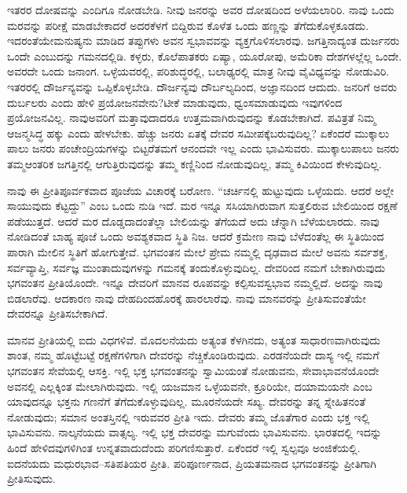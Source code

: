 ಇತರರ ದೋಷವನ್ನು ಎಂದಿಗೂ ನೋಡಬೇಡಿ. ನೀವು ಜನರನ್ನು ಅವರ ದೋಷದಿಂದ ಅಳೆಯಲಾರಿರಿ. ನಾವು ಒಂದು ಮರವನ್ನು ಪರೀಕ್ಷೆ ಮಾಡಬೇಕಾದರೆ ಅದರ\break ಕೆಳಗೆ ಬಿದ್ದಿರುವ ಕೊಳೆತ ಒಂದು ಹಣ್ಣನ್ನು ತೆಗೆದುಕೊಳ್ಳಕೂಡದು. ಇದರಂತೆಯೇ\break ಮನುಷ್ಯನು ಮಾಡಿದ ತಪ್ಪುಗಳು ಅವನ ಸ್ವಭಾವವನ್ನು ವ್ಯಕ್ತಗೊಳಿಸಲಾರವು. ಜಗತ್ತಿನಾದ್ಯಂತ ದುರ್ಜನರು ಒಂದೇ ಎಂಬುದನ್ನು ಗಮನದಲ್ಲಿಡಿ. ಕಳ್ಳರು, ಕೊಲೆಪಾತಕರು ಏಷ್ಯಾ, ಯೂರೋಪು, ಅಮೆರಿಕಾ ದೇಶಗಳಲ್ಲೆಲ್ಲ ಒಂದೇ. ಅವರದೇ ಒಂದು ಜನಾಂಗ. ಒಳ್ಳೆಯವರಲ್ಲಿ, ಪರಿಶುದ್ಧರಲ್ಲಿ, ಬಲಾಢ್ಯರಲ್ಲಿ ಮಾತ್ರ ನೀವು ವೈವಿಧ್ಯವನ್ನು ನೋಡುವಿರಿ. ಇತರರಲ್ಲಿ ದೌರ್ಜನ್ಯವನ್ನು ಒಪ್ಪಿಕೊಳ್ಳಬೇಡಿ. ದೌರ್ಜನ್ಯವು ದೌರ್ಬಲ್ಯದಿಂದ, ಅಜ್ಞಾನದಿಂದ ಆದುದು. ಜನರಿಗೆ ಅವರು ದುರ್ಬಲರು ಎಂದು ಹೇಳಿ ಪ್ರಯೋಜನವೇನು?\break ಟೀಕೆ ಮಾಡುವುದು, ಧ್ವಂಸಮಾಡುವುದು ಇವುಗಳಿಂದ ಪ್ರಯೋಜನವಿಲ್ಲ. ನಾವು\break ಅವರಿಗೆ ಮತ್ತಾವುದಾದರೂ ಉತ್ತಮವಾಗಿರುವುದನ್ನು ಕೊಡಬೇಕಾಗಿದೆ. ಪವಿತ್ರತೆ ನಿಮ್ಮ ಆಜನ್ಮಸಿದ್ಧ ಹಕ್ಕು ಎಂದು ಹೇಳಬೇಕು. ಹೆಚ್ಚು ಜನರು ಏತಕ್ಕೆ ದೇವರ ಸಮೀಪಕ್ಕೆ\break ಬರುವುದಿಲ್ಲ? ಏಕೆಂದರೆ ಮುಕ್ಕಾಲು ಪಾಲು ಜನರು ಪಂಚೇಂದ್ರಿಯಗಳನ್ನು ಬಿಟ್ಟರೆ\break ತಮಗೆ ಆನಂದವೇ ಇಲ್ಲ ಎಂದು ಭಾವಿಸುವರು. ಮುಕ್ಕಾಲುಪಾಲು ಜನರು ತಮ್ಮ\break ಆಂತರಿಕ ಜಗತ್ತಿನಲ್ಲಿ ಆಗುತ್ತಿರುವುದನ್ನು ತಮ್ಮ ಕಣ್ಣಿನಿಂದ ನೋಡುವುದಿಲ್ಲ, ತಮ್ಮ ಕಿವಿಯಿಂದ ಕೇಳುವುದಿಲ್ಲ.

ನಾವು ಈ ಪ್ರೀತಿಪೂರ್ವಕವಾದ ಪೂಜೆಯ ವಿಚಾರಕ್ಕೆ ಬರೋಣ. “ಚರ್ಚಿನಲ್ಲಿ ಹುಟ್ಟುವುದು ಒಳ್ಳೆಯದು. ಆದರೆ ಅಲ್ಲೇ ಸಾಯುವುದು ಕೆಟ್ಟದ್ದು” ಎಂಬ ಒಂದು ನುಡಿ ಇದೆ. ಮರ ಇನ್ನೂ ಸಸಿಯಾಗಿರುವಾಗ ಸುತ್ತಲಿರುವ ಬೇಲಿಯಿಂದ ರಕ್ಷಣೆ ಪಡೆಯುತ್ತದೆ. ಆದರೆ ಮರ ದೊಡ್ಡದಾದಂತೆಲ್ಲಾ ಬೇಲಿಯನ್ನು ತೆಗೆಯದೆ ಅದು ಚೆನ್ನಾಗಿ ಬೆಳೆಯಲಾರದು. ನಾವು ನೋಡಿದಂತೆ ಬಾಹ್ಯ ಪೂಜೆ ಒಂದು ಅವಶ್ಯಕವಾದ ಸ್ಥಿತಿ ನಿಜ. ಆದರೆ ಕ್ರಮೇಣ ನಾವು ಬೆಳೆದಂತೆಲ್ಲ ಈ ಸ್ಥಿತಿಯಿಂದ ಪಾರಾಗಿ ಮೇಲಿನ ಸ್ಥಿತಿಗೆ ಹೋಗುತ್ತೇವೆ. ಭಗವಂತನ ಮೇಲೆ ಪ್ರೇಮ ನಮ್ಮಲ್ಲಿ ದೃಢವಾದ ಮೇಲೆ ಅವನು ಸರ್ವಶಕ್ತ, ಸರ್ವವ್ಯಾಪ್ತಿ, ಸರ್ವಜ್ಞ ಮುಂತಾದುವುಗಳನ್ನು ಗಮನಕ್ಕೆ ತಂದುಕೊಳ್ಳುವುದಿಲ್ಲ. ದೇವರಿಂದ ನಮಗೆ ಬೇಕಾಗಿರುವುದು ಭಗವಂತನ ಪ್ರೀತಿಯೊಂದೇ. ಇನ್ನೂ ದೇವರಿಗೆ ಮಾನವ ರೂಪವನ್ನು ಕಲ್ಪಿಸುವ\break ಸ್ವಭಾವ ನಮ್ಮಲ್ಲಿದೆ. ಅದನ್ನು ನಾವು ಬಿಡಲಾರೆವು. ಆದಕಾರಣ ನಾವು ದೇಹದಿಂದ\break ಹೊರಕ್ಕೆ ಹಾರಲಾರೆವು. ನಾವು ಮಾನವರನ್ನು ಪ್ರೀತಿಸುವಂತೆಯೇ ದೇವರನ್ನೂ ಪ್ರೀತಿಸಬೇಕಾಗಿದೆ.

ಮಾನವ ಪ್ರೀತಿಯಲ್ಲಿ ಐದು ವಿಧಗಳಿವೆ. ಮೊದಲನೆಯದು ಅತ್ಯಂತ ಕೆಳಗಿನದು, ಅತ್ಯಂತ ಸಾಧಾರಣವಾಗಿರುವುದು ಶಾಂತ, ನಮ್ಮ ಹೊಟ್ಟೆಬಟ್ಟೆ ರಕ್ಷಣೆಗಳಿಗಾಗಿ ದೇವರನ್ನು ನೆಚ್ಚಿಕೊಂಡಿರುವುದು. ಎರಡನೆಯದೇ ದಾಸ್ಯ ಇಲ್ಲಿ ನಮಗೆ ಭಗವಂತನ ಸೇವೆಯಲ್ಲಿ ಆಸಕ್ತಿ. ಇಲ್ಲಿ ಭಕ್ತ ಭಗವಂತನನ್ನು ಸ್ವಾಮಿಯಂತೆ ನೋಡುವನು, ಸೇವಾಭಾವನೆಯೊಂದೇ ಅವನಲ್ಲಿ ಎಲ್ಲಕ್ಕಿಂತ ಮೇಲಾಗಿರುವುದು. ಇಲ್ಲಿ ಯಜಮಾನ ಒಳ್ಳೆಯವನೇ, ಕ್ರೂರಿಯೇ, ದಯಾಮಯನೇ ಎಂಬ ಯಾವುದನ್ನೂ ಭಕ್ತನು ಗಣನೆಗೆ ತೆಗೆದುಕೊಳ್ಳುವುದಿಲ್ಲ. ಮೂರನೆಯದೇ ಸಖ್ಯ. ದೇವರನ್ನು ತನ್ನ ಸ್ನೇಹಿತನಂತೆ ನೋಡುವುದು; ಸಮಾನ ಅಂತಸ್ತಿನಲ್ಲಿ ಇರುವವರ ಪ್ರೀತಿ ಇದು. ದೇವರು ತಮ್ಮ ಜೊತೆಗಾರ ಎಂದು ಭಕ್ತ ಇಲ್ಲಿ ಭಾವಿಸುವನು. ನಾಲ್ಕನೆಯದು ವಾತ್ಸಲ್ಯ. ಇಲ್ಲಿ ಭಕ್ತ ದೇವರನ್ನು ಮಗುವೆಂದು ಭಾವಿಸುವನು. ಭಾರತದಲ್ಲಿ ಇದನ್ನು ಹಿಂದೆ ಹೇಳಿದವುಗಳಿಗಿಂತ ಉನ್ನತವಾದುದೆಂದು ಪರಿಗಣಿಸುತ್ತಾರೆ. ಏಕೆಂದರೆ ಇಲ್ಲಿ ಸ್ವಲ್ಪವೂ ಅಂಜಿಕೆಯಲ್ಲಿ. ಐದನೆಯದು ಮಧುರಭಾವ–ಸತಿಪತಿಯರ ಪ್ರೀತಿ. ಪರಿಪೂರ್ಣನಾದ, ಪ್ರಿಯತಮನಾದ ಭಗವಂತನನ್ನು ಪ್ರೀತಿಗಾಗಿ ಪ್ರೀತಿಸುವುದು.


